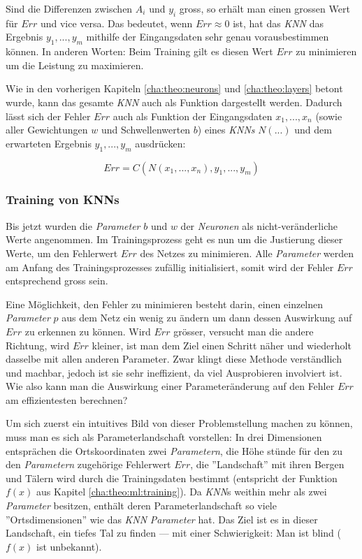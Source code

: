 Sind die Differenzen zwischen $A_i$ und $y_i$ gross, so erhält man einen grossen Wert für $Err$ und vice versa. Das bedeutet, wenn $Err \approx 0$ ist, hat das \textit{KNN} das Ergebnis $y_1,...,y_m$ mithilfe der Eingangsdaten sehr genau vorausbestimmen können. In anderen Worten: Beim Training gilt es diesen Wert $Err$ zu minimieren um die Leistung zu maximieren.

Wie in den vorherigen Kapiteln \ref{cha:theo:neurons} und \ref{cha:theo:layers} betont wurde, kann das gesamte \textit{KNN} auch als Funktion dargestellt werden. Dadurch lässt sich der Fehler $Err$ auch als Funktion der Eingangsdaten $x_1,...,x_n$ (sowie aller Gewichtungen $w$ und Schwellenwerten $b$) eines \textit{KNNs} $N(...)$ und dem erwarteten Ergebnis $y_1,...,y_m$  ausdrücken:

\begin{equation}\label{eq:err_func}
Err = C(N(x_1,...,x_n), y_1,...,y_m)
\end{equation}

\subsubsection{Training von KNNs}\label{cha:theo:backprop}
Bis jetzt wurden die \textit{Parameter} $b$ und $w$ der \textit{Neuronen} als nicht-veränderliche Werte angenommen. Im Trainingsprozess geht es nun um die Justierung dieser Werte, um den Fehlerwert $Err$ des Netzes zu minimieren. Alle \textit{Parameter} werden am Anfang des Trainingsprozesses zufällig initialisiert, somit wird der Fehler $Err$ entsprechend gross sein.

Eine Möglichkeit, den Fehler zu minimieren besteht darin, einen einzelnen \textit{Parameter} $p$ aus dem Netz ein wenig zu ändern um dann dessen Auswirkung auf $Err$ zu erkennen zu können. Wird $Err$ grösser, versucht man die andere Richtung, wird $Err$ kleiner, ist man dem Ziel einen Schritt näher und wiederholt dasselbe mit allen anderen Parameter. Zwar klingt diese Methode verständlich und machbar, jedoch ist sie sehr ineffizient, da viel Ausprobieren involviert ist. Wie also kann man die Auswirkung einer Parameteränderung auf den Fehler $Err$ am effizientesten berechnen?

Um sich zuerst ein intuitives Bild von dieser Problemstellung machen zu können, muss man es sich als Parameterlandschaft vorstellen: In drei Dimensionen entsprächen die Ortskoordinaten zwei \textit{Parametern}, die Höhe stünde für den zu den \textit{Parametern} zugehörige Fehlerwert $Err$, die ''Landschaft'' mit ihren Bergen und Tälern wird durch die Trainingsdaten bestimmt (entspricht der Funktion $f(x)$ aus Kapitel \ref{cha:theo:ml:training}). Da \textit{KNN}s weithin mehr als zwei \textit{Parameter} besitzen, enthält deren Parameterlandschaft so viele ''Ortsdimensionen'' wie das \textit{KNN} \textit{Parameter} hat. Das Ziel ist es in dieser Landschaft, ein tiefes Tal zu finden --- mit einer Schwierigkeit: Man ist blind ($f(x)$ ist unbekannt).

